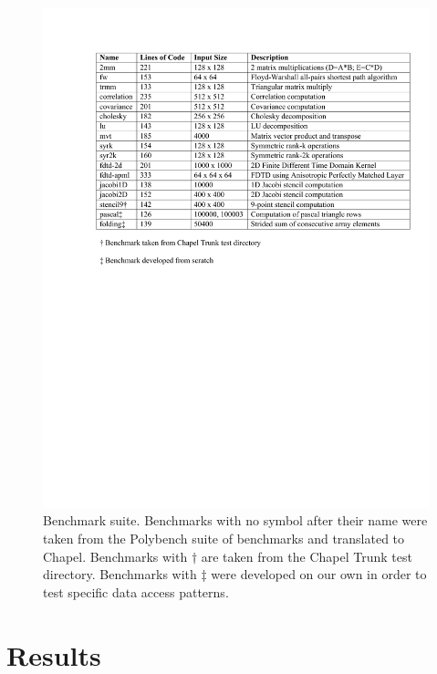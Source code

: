 \begin{figure}
	\begin{center}
	\includegraphics[scale=0.53]{./Figures/Benchmarks.pdf}
	\caption{Benchmark suite. Benchmarks with no symbol after their name were taken from the Polybench suite of benchmarks and translated to Chapel. Benchmarks with $\dagger$ are taken from the Chapel Trunk test directory. Benchmarks with $\ddagger$ were developed on our own in order to test specific data access patterns. }
	\label{benchmarks}
	\end{center}
\end{figure}

\section{Results}\label{sec:results}

